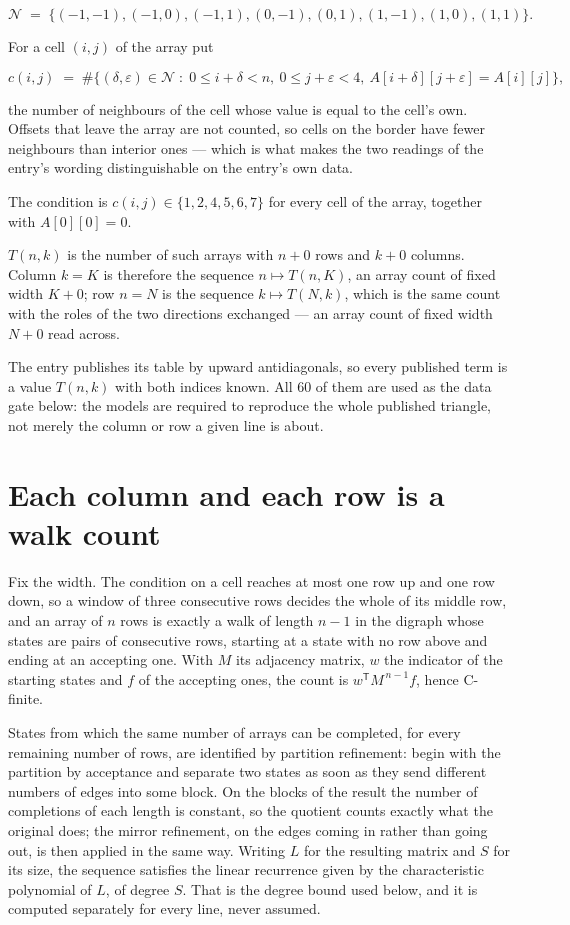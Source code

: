 \documentclass[11pt]{article}
\theoremstyle{definition}
\begin{document}
\[\mathcal{N} \;=\; \{(-1,-1), (-1,0), (-1,1), (0,-1), (0,1), (1,-1), (1,0), (1,1)\}.\]

For a cell $(i,j)$ of the array put

\[c(i,j) \;=\; \#\bigl\{(\delta,\varepsilon)\in\mathcal{N} \;:\; 0\le i+\delta<n,\ 0\le j+\varepsilon<4,\ A[i+\delta][j+\varepsilon] = A[i][j]\bigr\},\]

the number of neighbours of the cell whose value is equal to the cell's own. Offsets that leave the array are not counted, so cells on the border have fewer neighbours than interior ones --- which is what makes the two readings of the entry's wording distinguishable on the entry's own data.

The condition is $c(i,j) \in \{1, 2, 4, 5, 6, 7\}$ for every cell of the array, together with $A[0][0]=0$.

$T(n,k)$ is the number of such arrays with $n + 0$ rows and $k + 0$ columns. Column $k = K$ is therefore the sequence $n \mapsto T(n,K)$, an array count of fixed width $K + 0$; row $n = N$ is the sequence $k \mapsto T(N,k)$, which is the same count with the roles of the two directions exchanged --- an array count of fixed width $N + 0$ read across.

The entry publishes its table by upward antidiagonals, so every published term is a value $T(n,k)$ with both indices known. All 60 of them are used as the data gate below: the models are required to reproduce the whole published triangle, not merely the column or row a given line is about.

\section{Each column and each row is a walk count}

Fix the width. The condition on a cell reaches at most one row up and one row down, so a window of three consecutive rows decides the whole of its middle row, and an array of $n$ rows is exactly a walk of length $n-1$ in the digraph whose states are pairs of consecutive rows, starting at a state with no row above and ending at an accepting one. With $M$ its adjacency matrix, $w$ the indicator of the starting states and $f$ of the accepting ones, the count is $w^{\mathsf T}M^{\,n-1}f$, hence C-finite.

States from which the same number of arrays can be completed, for every remaining number of rows, are identified by partition refinement: begin with the partition by acceptance and separate two states as soon as they send different numbers of edges into some block. On the blocks of the result the number of completions of each length is constant, so the quotient counts exactly what the original does; the mirror refinement, on the edges coming in rather than going out, is then applied in the same way. Writing $L$ for the resulting matrix and $S$ for its size, the sequence satisfies the linear recurrence given by the characteristic polynomial of $L$, of degree $S$. That is the degree bound used below, and it is computed separately for every line, never assumed.
\end{document}
